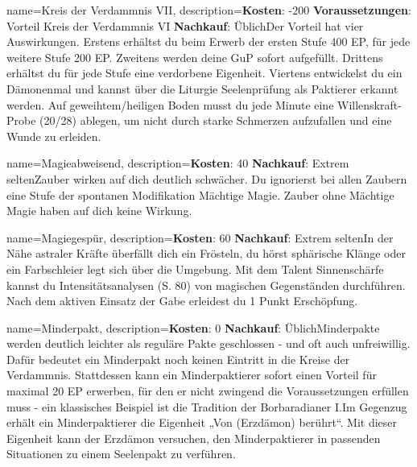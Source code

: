 {
    name={Kreis der Verdammnis VII},
    description={\textbf{Kosten}: -200 \textbf{Voraussetzungen}: Vorteil Kreis der Verdammnis VI \textbf{Nachkauf}: Üblich\newline Der Vorteil hat vier Auswirkungen. Erstens erhältst du beim Erwerb der ersten Stufe 400 EP, für jede weitere Stufe 200 EP. Zweitens werden deine GuP sofort aufgefüllt. Drittens erhältst du für jede Stufe eine verdorbene Eigenheit. Viertens entwickelst du ein Dämonenmal und kannst über die Liturgie Seelenprüfung als Paktierer erkannt werden. Auf geweihtem/heiligen Boden musst du jede Minute eine Willenskraft-Probe (20/28) ablegen, um nicht durch starke Schmerzen aufzufallen und eine Wunde zu erleiden.}
}


{
    name={Magieabweisend},
    description={\textbf{Kosten}: 40 \textbf{Nachkauf}: Extrem selten\newline Zauber wirken auf dich deutlich schwächer. Du ignorierst bei allen Zaubern eine Stufe der spontanen Modifikation Mächtige Magie. Zauber ohne Mächtige Magie haben auf dich keine Wirkung.}
}


{
    name={Magiegespür},
    description={\textbf{Kosten}: 60 \textbf{Nachkauf}: Extrem selten\newline In der Nähe astraler Kräfte überfällt dich ein Frösteln, du hörst sphärische Klänge oder ein Farbschleier legt sich über die Umgebung. Mit dem Talent Sinnenschärfe kannst du Intensitätsanalysen (S. 80) von magischen Gegenständen durchführen. Nach dem aktiven Einsatz der Gabe erleidest du 1 Punkt Erschöpfung.}
}


{
    name={Minderpakt},
    description={\textbf{Kosten}: 0 \textbf{Nachkauf}: Üblich\newline Minderpakte werden deutlich leichter als reguläre Pakte geschlossen - und oft auch unfreiwillig. Dafür bedeutet ein Minderpakt noch keinen Eintritt in die Kreise der Verdammnis. Stattdessen kann ein Minderpaktierer sofort einen Vorteil für maximal 20 EP erwerben, für den er nicht zwingend die Voraussetzungen erfüllen muss - ein klassisches Beispiel ist die Tradition der Borbaradianer I.\newline   Im Gegenzug erhält ein Minderpaktierer die Eigenheit „Von (Erzdämon) berührt“. Mit dieser Eigenheit kann der Erzdämon versuchen, den Minderpaktierer in passenden Situationen zu einem Seelenpakt zu verführen.}
}


